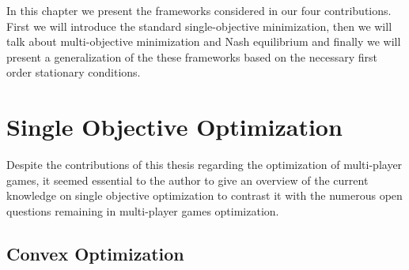 














In this chapter we present the frameworks considered in our four contributions. First we will introduce the standard single-objective minimization, then we will talk about multi-objective minimization and Nash equilibrium and finally we will present a generalization of the these frameworks based on the necessary first order stationary conditions.
















\section{Single Objective Optimization}




Despite the contributions of this thesis regarding the optimization of multi-player games, it seemed essential to the author to give an overview of the current knowledge on single objective optimization to contrast it with the numerous open questions remaining in multi-player games optimization. 







\subsection{Convex Optimization}







